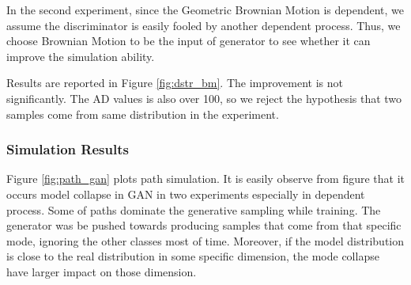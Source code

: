 \documentclass{article}
\begin{document}
	In the second experiment, 
	since the Geometric Brownian Motion is dependent, we assume the discriminator is easily fooled by another dependent process.
	Thus, we choose Brownian Motion to be the input of generator to see whether it can improve the simulation ability.

	Results are reported in Figure \ref{fig:dstr_bm}. 
	The improvement is not significantly.
	The AD values is also over 100, so we reject the hypothesis that two samples come from same distribution in the experiment. 
	
	\subsubsection{Simulation Results}
	
	Figure \ref{fig:path_gan} plots path simulation.
	It is easily observe from figure that it occurs model collapse in GAN in two experiments especially in dependent process. 
	Some of paths dominate the generative sampling while training.
	The generator was be pushed towards producing samples that come from that specific mode, ignoring the other classes most of time. 
	Moreover, if the model distribution is close to the real distribution in some specific dimension, the mode collapse have larger impact on those dimension.
	
\end{document}
